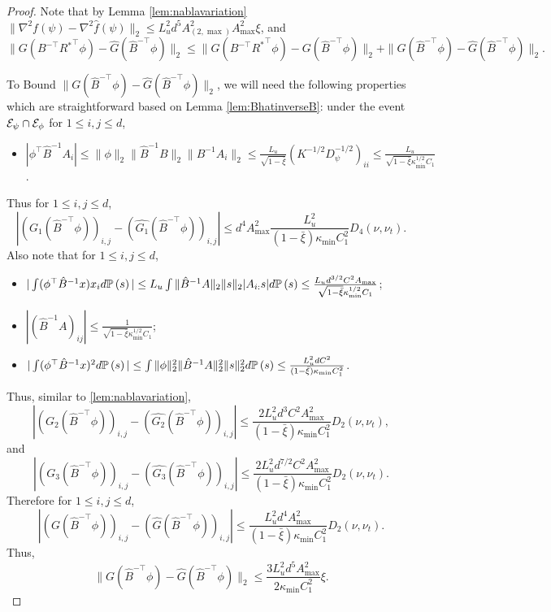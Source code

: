 \begin{proof}
Note that by Lemma \ref{lem:nablavariation} $\|\nabla^2 f(\psi) - \nabla^2 \hat{f}(\psi)\|_2 \le L_u^2  d^5 A_{(2,\max)}^2A_{\max}^2\xi$, and 
\[
\|G(B^{-\top}R{^*}^{\top}\phi) - \hat{G}(\hat{B}^{-\top}\phi)\|_2
\le 
\|G(B^{-\top}{R^*}^{\top}\phi) - G(\hat{B}^{-\top}\phi)\|_2
+ \|G(\hat{B}^{-\top}\phi) - \hat{G}(\hat{B}^{-\top}\phi)\|_2.
\]

To Bound $\|G(\hat{B}^{-\top}\phi) - \hat{G}(\hat{B}^{-\top}\phi)\|_2$, we will need the following properties which are straightforward based on Lemma \ref{lem:BhatinverseB}: 
under the event $ \mathcal{E}_{\psi}\cap \mathcal{E}_{\phi} $ for $1\le i, j\le d$,
\begin{itemize}
\item $|\phi^{\top}\hat{B}^{-1}A_i| \le \|\phi\|_2\|\hat{B}^{-1}B\|_2\|B^{-1}A_i\|_2\le
 \frac{L_u}{\sqrt{1-\bar{\xi}}} (K^{-1/2}D^{-1/2}_{\psi})_{ii} \le
 \frac{L_u}{\sqrt{1-\bar{\xi}}\kappa_{\min}^{1/2}C_1}$.
\end{itemize}
Thus for $1\le i, j\le d$,
\[
|(G_1(\hat{B}^{-\top}\phi))_{i,j} - (\hat{G_1}(\hat{B}^{-\top}\phi))_{i,j}| \le
d^4A^2_{\max}\frac{L_u^2}{(1-\bar{\xi})\kappa_{\min}C_1^2}D_4(\nu,\nu_t).
\]
Also note that for $1\le i, j\le d$,
\begin{itemize}
\item $|\int(\phi^{\top}\hat{B}^{-1}x)x_i d\mathbb{P}\left(s\right)| 
\le L_u\int \|\hat{B}^{-1}A\|_2\|s\|_2 |A_{i:}s| d\mathbb{P}\left(s\right)
\le \frac{L_ud^{3/2}C^2A_{\max}}{\sqrt{1-\bar{\xi}}\kappa_{\min}^{1/2}C_1}$; 
\item $|(\hat{B}^{-1}A)_{ij}| \le \frac{1}{\sqrt{1-\bar{\xi}}\kappa_{\min}^{1/2}C_1}$;
\item $|\int(\phi^{\top}\hat{B}^{-1}x)^2 d\mathbb{P}\left(s\right)|\le
 \int \|\phi\|_2^2 \|\hat{B}^{-1}A\|_2^2\|s\|_2^2 d\mathbb{P}\left(s\right) \le \frac{L_u^2dC^2}{(1-\bar{\xi})\kappa_{\min}C_1^2}$.
\end{itemize}
Thus, similar to \ref{lem:nablavariation},
\[
|(G_2(\hat{B}^{-\top}\phi))_{i,j} - (\hat{G_2}(\hat{B}^{-\top}\phi))_{i,j}| \le
\frac{2L_u^2d^3C^2A^2_{\max}}{(1-\bar{\xi})\kappa_{\min}C_1^2}D_2(\nu,\nu_t),
\]
and 
\[
|(G_3(\hat{B}^{-\top}\phi))_{i,j} - (\hat{G_3}(\hat{B}^{-\top}\phi))_{i,j}| \le
\frac{2L_u^2d^{7/2}C^2A^2_{\max}}{(1-\bar{\xi})\kappa_{\min}C_1^2}D_2(\nu,\nu_t).
\]
Therefore for $1\le i,j\le d$,
\[
\left|\left(G(\hat{B}^{-\top}\phi)\right)_{i,j} - \left(\hat{G}(\hat{B}^{-\top}\phi)\right)_{i,j}\right| 
\le
\frac{L_u^2d^4A^2_{\max}}{(1-\bar{\xi})\kappa_{\min}C_1^2}D_2(\nu,\nu_t). 
\]
Thus, 
\begin{equation}
\label{eq:fBhatfhatBhat}
 \|G(\hat{B}^{-\top}\phi) - \hat{G}(\hat{B}^{-\top}\phi)\|_2 \le 
\frac{3L_u^2d^5A^2_{\max}}{2\kappa_{\min}C_1^2}\xi.
\end{equation}


\end{proof}
